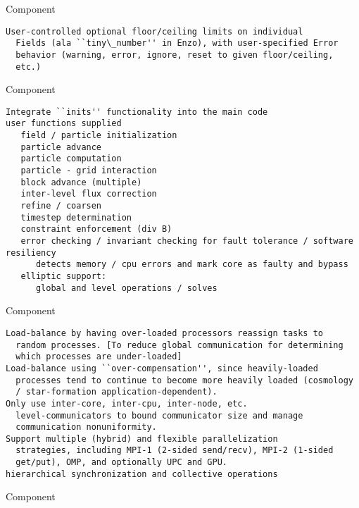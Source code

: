 \documentclass[14pt,letter]{article}
\begin{document}
 Component

\begin{verbatim}
User-controlled optional floor/ceiling limits on individual
  Fields (ala ``tiny\_number'' in Enzo), with user-specified Error
  behavior (warning, error, ignore, reset to given floor/ceiling,
  etc.)
\end{verbatim}

 Component

\begin{verbatim}
Integrate ``inits'' functionality into the main code
user functions supplied
   field / particle initialization
   particle advance
   particle computation
   particle - grid interaction
   block advance (multiple)
   inter-level flux correction
   refine / coarsen
   timestep determination
   constraint enforcement (div B)
   error checking / invariant checking for fault tolerance / software resiliency
      detects memory / cpu errors and mark core as faulty and bypass
   elliptic support:
      global and level operations / solves
\end{verbatim}

 Component

\begin{verbatim}
Load-balance by having over-loaded processors reassign tasks to
  random processes. [To reduce global communication for determining
  which processes are under-loaded]
Load-balance using ``over-compensation'', since heavily-loaded
  processes tend to continue to become more heavily loaded (cosmology
  / star-formation application-dependent).
Only use inter-core, inter-cpu, inter-node, etc.
  level-communicators to bound communicator size and manage
  communication nonuniformity.
Support multiple (hybrid) and flexible parallelization
  strategies, including MPI-1 (2-sided send/recv), MPI-2 (1-sided
  get/put), OMP, and optionally UPC and GPU.
hierarchical synchronization and collective operations
\end{verbatim}

 Component
\end{document}

